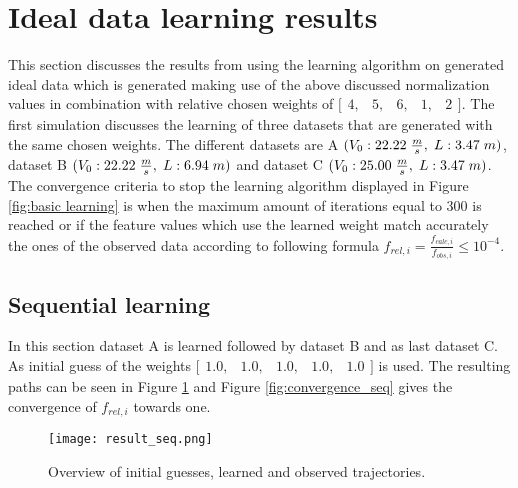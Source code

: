 \section{Ideal data learning results}
This section discusses the results from using the learning algorithm on generated ideal data which is generated making use of the above discussed normalization values in combination with relative chosen weights of $ \bigl[ \begin{smallmatrix} 4,&5,&6,&1,&2\end{smallmatrix}\bigr]$. The first simulation discusses the learning of three datasets that are generated with the same chosen weights. The different datasets are A $(V_0:22.22\hspace{1mm}\frac{m}{s},\hspace{1mm} L:3.47\hspace{1mm}m)$, dataset B $(V_0:22.22\hspace{1mm}\frac{m}{s},\hspace{1mm} L:6.94\hspace{1mm}m)$ and dataset C $(V_0:25.00\hspace{1mm}\frac{m}{s},\hspace{1mm} L:3.47\hspace{1mm}m)$. The convergence criteria to stop the learning algorithm displayed in Figure \ref{fig:basic learning} is when the maximum amount of iterations equal to $300$ is reached or if the feature values which use the learned weight match accurately the ones of the observed data according to following formula $f_{rel,i} = \frac{f_{calc,i}}{f_{obs,i}} \leq 10^{-4}$.

\subsection{Sequential learning}
In this section dataset A is learned followed by dataset B and as last dataset C.
As initial guess of the weights $\bigl[ \begin{smallmatrix} 1.0,&1.0,&1.0,&1.0,&1.0\end{smallmatrix}\bigr]$ is used.  The resulting paths can be seen in Figure \ref{fig:result_seq} and Figure \ref{fig:convergence_seq} gives the convergence of $f_{rel,i}$ towards one.\\

\begin{figure}[h!]
	\centering
	\texttt{[image: result\_seq.png]}
	\caption{Overview of initial guesses, learned and observed trajectories.} 
	\label{fig:result_seq}
\end{figure}

